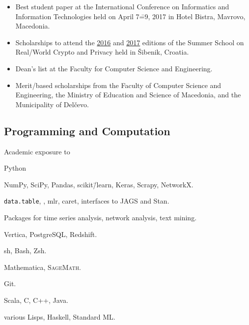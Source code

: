 \documentclass[version=last, fontsize=10pt, paper=A4, toc=bibliography]{scrartcl}%
\begin{document}
\label{sec:honors-achievements}

\begin{itemize}
\item Best student paper at the  International Conference on Informatics
  and Information Technologies held on April 7\==9, 2017 in Hotel Bistra,
  Mavrovo, Macedonia.
\item Scholarships to attend the
  \href{http://summerschool-croatia.cs.ru.nl/2016/}{2016} and
  \href{http://summerschool-croatia.cs.ru.nl/2017/}{2017} editions of the Summer
  School on Real\-/World Crypto and Privacy held in Šibenik, Croatia.
\item Dean's list at the Faculty for Computer Science and Engineering.
\item Merit\-/based scholarships from the Faculty of Computer Science and
  Engineering, the Ministry of Education and Science of Macedonia, and the
  Municipality of Delčevo.
\end{itemize}

\label{sec:skills}

\subsection*{Programming and
  Computation}\label{subsec:programming-computation}

\begingroup
{}%
\begin{labeling}[~\==]{Academic exposure to}
\item[Proficient with]
  \begingroup
  \begin{labeling}[~\==]{Python}
  \item[Python] NumPy, SciPy, Pandas, scikit\=/learn, Keras, Scrapy, NetworkX.
  \item[R] \texttt{data.table}, , mlr, caret,
    interfaces to JAGS and Stan.

    Packages for time series analysis, network analysis, text mining.
  \item[SQL] Vertica, PostgreSQL, Redshift.
  \item[Shell] sh, Bash, Zsh.
  \item[CAS] Mathematica\textregistered, \textsc{SageMath}.
  \item[(D)VCS] Git.%
  \end{labeling}
  \endgroup
\item[Familiar with] Scala, C, C++, Java.
\item[Academic exposure to] various Lisps, Haskell, Standard ML\@.
\end{labeling}
\endgroup
\end{document}
